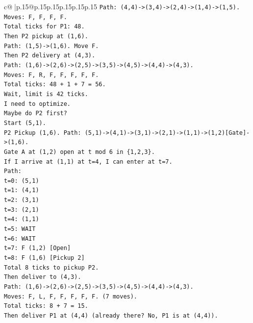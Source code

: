 \documentclass{article}
\begin{document}
{\begin{supertabular}{c@{$\;$}|p{.15\linewidth}@{}p{.15\linewidth}p{.15\linewidth}p{.15\linewidth}p{.15\linewidth}p{.15\linewidth}}
{{{\texttt{Path: (4,4){-}>(3,4){-}>(2,4){-}>(1,4){-}>(1,5).} \\
\texttt{Moves: F, F, F, F.} \\
\texttt{Total ticks for P1: 48.} \\
\texttt{Then P2 pickup at (1,6).} \\
\texttt{Path: (1,5){-}>(1,6). Move F.} \\
\texttt{Then P2 delivery at (4,3).} \\
\texttt{Path: (1,6){-}>(2,6){-}>(2,5){-}>(3,5){-}>(4,5){-}>(4,4){-}>(4,3).} \\
\texttt{Moves: F, R, F, F, F, F, F.} \\
\texttt{Total ticks: 48 + 1 + 7 = 56.} \\
\texttt{Wait, limit is 42 ticks.} \\
\texttt{I need to optimize.} \\
\texttt{Maybe do P2 first?} \\
\texttt{Start (5,1).} \\
\texttt{P2 Pickup (1,6). Path: (5,1){-}>(4,1){-}>(3,1){-}>(2,1){-}>(1,1){-}>(1,2){[}Gate{]}{-}>(1,6).} \\
\texttt{Gate A at (1,2) open at t mod 6 in \{1,2,3\}.} \\
\texttt{If I arrive at (1,1) at t=4, I can enter at t=7.} \\
\texttt{Path:} \\
\texttt{t=0: (5,1)} \\
\texttt{t=1: (4,1)} \\
\texttt{t=2: (3,1)} \\
\texttt{t=3: (2,1)} \\
\texttt{t=4: (1,1)} \\
\texttt{t=5: WAIT} \\
\texttt{t=6: WAIT} \\
\texttt{t=7: F (1,2) {[}Open{]}} \\
\texttt{t=8: F (1,6) {[}Pickup 2{]}} \\
\texttt{Total 8 ticks to pickup P2.} \\
\texttt{Then deliver to (4,3).} \\
\texttt{Path: (1,6){-}>(2,6){-}>(2,5){-}>(3,5){-}>(4,5){-}>(4,4){-}>(4,3).} \\
\texttt{Moves: F, L, F, F, F, F, F. (7 moves).} \\
\texttt{Total ticks: 8 + 7 = 15.} \\
\texttt{Then deliver P1 at (4,4) (already there? No, P1 is at (4,4)).} \\
}}}
\end{supertabular}}
\end{document}
